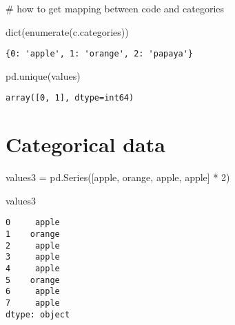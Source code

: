 \documentclass[
  letterpaper,
  DIV=11,
  numbers=noendperiod]{scrreprt}
\newenvironment{Shaded}{\begin{snugshade}}{\end{snugshade}}
\newcommand{\BuiltInTok}[1]{\textcolor[rgb]{0.00,0.23,0.31}{#1}}
\newcommand{\CommentTok}[1]{\textcolor[rgb]{0.37,0.37,0.37}{#1}}
\newcommand{\DecValTok}[1]{\textcolor[rgb]{0.68,0.00,0.00}{#1}}
\newcommand{\NormalTok}[1]{\textcolor[rgb]{0.00,0.23,0.31}{#1}}
\newcommand{\OperatorTok}[1]{\textcolor[rgb]{0.37,0.37,0.37}{#1}}
\newcommand{\StringTok}[1]{\textcolor[rgb]{0.13,0.47,0.30}{#1}}
\begin{document}
\begin{Shaded}
\begin{Highlighting}[]
\CommentTok{\# how to get mapping between code and categories}

\BuiltInTok{dict}\NormalTok{(}\BuiltInTok{enumerate}\NormalTok{(c.categories))}
\end{Highlighting}
\end{Shaded}

\begin{verbatim}
{0: 'apple', 1: 'orange', 2: 'papaya'}
\end{verbatim}

\begin{Shaded}
\begin{Highlighting}[]
\NormalTok{pd.unique(values)}
\end{Highlighting}
\end{Shaded}

\begin{verbatim}
array([0, 1], dtype=int64)
\end{verbatim}

\hypertarget{categorical-data-2}{%
\section{Categorical data}\label{categorical-data-2}}

\begin{Shaded}
\begin{Highlighting}[]
\NormalTok{values3 }\OperatorTok{=}\NormalTok{ pd.Series([}\StringTok{\textquotesingle{}apple\textquotesingle{}}\NormalTok{, }\StringTok{\textquotesingle{}orange\textquotesingle{}}\NormalTok{, }\StringTok{\textquotesingle{}apple\textquotesingle{}}\NormalTok{,}
                    \StringTok{\textquotesingle{}apple\textquotesingle{}}\NormalTok{] }\OperatorTok{*} \DecValTok{2}\NormalTok{)}
\end{Highlighting}
\end{Shaded}

\begin{Shaded}
\begin{Highlighting}[]
\NormalTok{values3}
\end{Highlighting}
\end{Shaded}

\begin{verbatim}
0     apple
1    orange
2     apple
3     apple
4     apple
5    orange
6     apple
7     apple
dtype: object
\end{verbatim}
\end{document}
